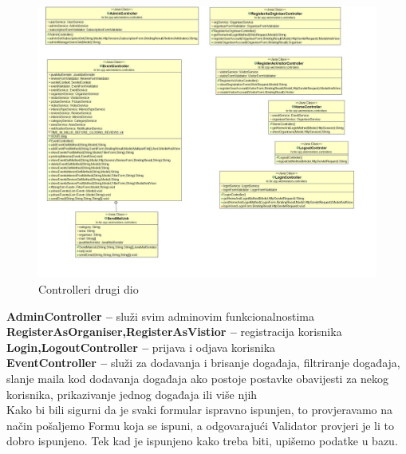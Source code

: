 		\begin{figure}[H]
			\includegraphics[scale=0.4]{slike/dijagram3b.jpg}
			\centering
			\caption{Controlleri drugi dio}
			\label{fig:dijagramraz6}
		\end{figure}
	
	\noindent\textbf{AdminController – } služi svim adminovim funkcionalnostima\\
	\textbf{RegisterAsOrganiser,RegisterAsVistior – } registracija korisnika\\
	\textbf{Login,LogoutController – } prijava i odjava korisnika\\
	\textbf{EventController – } služi za dodavanja i brisanje događaja, filtriranje događaja, slanje maila kod dodavanja događaja ako postoje postavke obavijesti za nekog korisnika, prikazivanje jednog događaja ili više njih\\
	
	\normalfont\noindent Kako bi bili sigurni da je svaki formular ispravno ispunjen, to provjeravamo na način pošaljemo Formu koja se ispuni, a odgovarajući Validator provjeri je li to dobro ispunjeno. Tek kad je ispunjeno kako treba biti, upišemo podatke u bazu.
	

